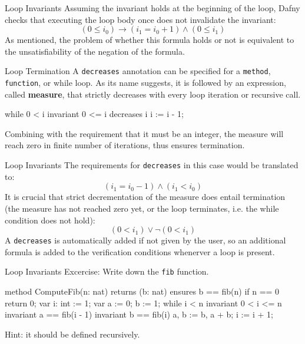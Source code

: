 \documentclass[10pt, compress]{beamer}
\begin{document}
\begin{frame}[fragile]{Loop Invariants}
Assuming the invariant holds at the beginning of the loop, Dafny checks that executing the loop body once does not invalidate the invariant:
    $$(0 \leq i_0) \to (i_1 = i_0 + 1) \land (0 \leq i_1)$$
As mentioned, the problem of whether this formula holds or not is equivalent to the unsatisfiability of the negation of the formula.

\end{frame}

\begin{frame}[fragile]{Loop Termination}
  A \verb|decreases| annotation can be specified for a \verb|method|, \verb|function|, or while loop. As its name suggests, it is followed by an expression, called \textbf{measure}, that strictly decreases with every loop iteration or recursive call.
  \begin{verbnobox}[\footnotesize]
while 0 < i
   invariant 0 <= i
   decreases i
{
   i := i - 1;
}
  \end{verbnobox}
Combining with the requirement that it must be an integer, the measure will reach zero in finite number of iterations, thus ensures termination.
\end{frame}

\begin{frame}[fragile]{Loop Invariants}
The requirements for \verb|decreases| in this case would be translated to:
  $$(i_1 = i_0 - 1) \land (i_1 < i_0)$$
It is crucial that strict decrementation of the measure does entail termination (the measure has not reached zero yet, or the loop terminates, i.e. the while condition does not hold):
  $$(0 < i_1) \lor \neg(0 < i_1) $$
A \verb|decreases| is automatically added if not given by the user, so an additional formula is added to the verification conditions whenerver a loop is present.
\end{frame}

\begin{frame}[fragile]{Loop Invariants}
  Excercise: Write down the \verb|fib| function.
  \begin{verbnobox}[\footnotesize]
method ComputeFib(n: nat) returns (b: nat)
   ensures b == fib(n)
{
   if n == 0 { return 0; }
   var i: int := 1;
   var a := 0;
       b := 1;
   while i < n
      invariant 0 < i <= n
      invariant a == fib(i - 1)
      invariant b == fib(i)
   {
      a, b := b, a + b;
      i := i + 1;
   }
}
  \end{verbnobox}
  Hint: it should be defined recursively.
\end{frame}
\end{document}
